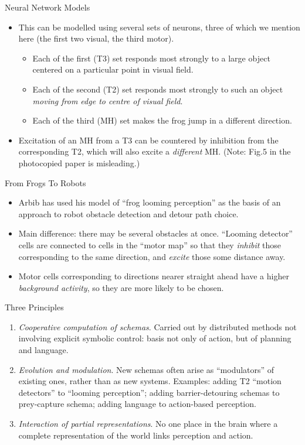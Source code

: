 \documentclass{article}
\begin{document}
\begin{slide}{}
{\Large Neural Network Models}
\begin{itemize}
\item This can be modelled using several sets of neurons,
three of which we mention here (the first two visual, the third motor).
\begin{itemize}
\item Each of the first (T3) set responds most strongly to a large
object centered on a particular point in visual field.
\item Each of the second (T2) set responds most strongly to such an
object {\em moving from edge to centre of visual field}.
\item Each of the third (MH) set makes the frog jump in a different direction.
\end{itemize}
\item Excitation of an MH from a T3 can be countered by inhibition from the
corresponding T2, which will also excite a {\em different} MH. (Note:
Fig.5 in the photocopied paper is misleading.)
\end{itemize}
\end{slide}

\begin{slide}{}
{\Large From Frogs To Robots}
\begin{itemize}
\item Arbib has used his model of ``frog looming perception'' as the
basis of an approach to robot obstacle detection and detour path choice.
\item Main difference: there may be several obstacles at
once. ``Looming detector'' cells are connected to cells in the ``motor
map'' so that they {\em inhibit} those corresponding to the same
direction, and {\em excite} those some distance away.
\item Motor cells corresponding to directions nearer straight ahead
have a higher {\em background activity}, so they are more likely to be chosen.
\end{itemize}
\end{slide}

\begin{slide}{}
{\Large Three Principles}
\begin{enumerate}
\item {\em Cooperative computation of schemas}. Carried out by distributed
methods not involving explicit symbolic control: basis not only of
action, but of planning and language.
\item {\em Evolution and modulation}. New schemas often arise as
``modulators'' of existing ones, rather than as new systems. Examples:
adding T2 ``motion detectors'' to ``looming perception''; adding
barrier-detouring schemas to prey-capture schema; adding language to
action-based perception.
\item {\em Interaction of partial representations}. No one place in the
brain where a complete representation of the world links perception
and action.
\end{enumerate}
\end{slide}
\end{document}
